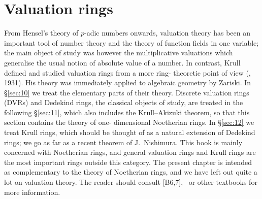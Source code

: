 \chapter{Valuation rings}\label{ch:4}

From Hensel's theory of $p$-adic numbers onwards, valuation theory has
been an important tool of number theory and the theory of function fields in
one variable; the main object of study was however the multiplicative
valuations which generalise the usual notion of absolute value of a number.
In contrast, Krull defined and studied valuation rings from a more ring-
theoretic point of view (\cite{Kr3}, 1931). His theory was immediately applied to
algebraic geometry by Zariski. In \S\ref{sec:10} we treat the elementary parts of their
theory. Discrete valuation rings (DVRs) and Dedekind rings, the classical
objects of study, are treated in the following \S\ref{sec:11}, which also includes the
Krull--Akizuki theorem, so that this section contains the theory of one-
dimensional Noetherian rings. In \S\ref{sec:12} we treat Krull rings, which should be
thought of as a natural extension of Dedekind rings; we go as far as a recent
theorem of J.\ Nishimura. This book is mainly concerned with Noetherian
rings, and general valuation rings and Krull rings are the most important
rings outside this category. The present chapter is intended as
complementary to the theory of Noetherian rings, and we have left out
quite a lot on valuation theory. The reader should consult [B6,7],~\cite{ZS} or
other textbooks for more information.




